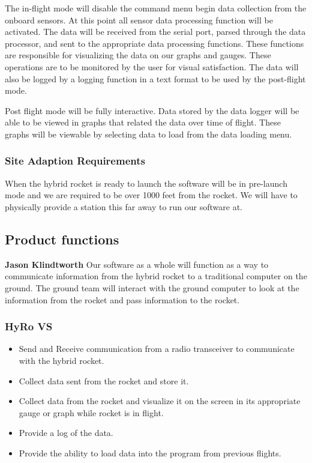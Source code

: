 \documentclass[10pt,draftclsnofoot,onecolumn,compsoc]{IEEEtran}
\begin{document}
	The in-flight mode will disable the command menu begin data collection from the onboard sensors. At this point all sensor data processing function will be activated. The data will be received from the serial port, parsed through the data processor, and sent to the appropriate data processing functions. These functions are responsible for visualizing the data on our graphs and gauges. These operations are to be monitored by the user for visual satisfaction.  The data will also be logged by a logging function in a text format to be used by the post-flight mode. \par
	Post flight mode will be fully interactive. Data stored by the data logger will be able to be viewed in graphs that related the data over time of flight. These graphs will be viewable by selecting data to load from the data loading menu.\par

\subsubsection{Site Adaption Requirements}
When the hybrid rocket is ready to launch the software will be in pre-launch mode and we are required to be over 1000 feet from the rocket. We will have to physically provide a station this far away to run our software at.

\subsection{ Product functions}
{\bf Jason Klindtworth}
Our software as a whole will function as a way to communicate information from the hybrid rocket to a traditional computer on the ground. The ground team will interact with the ground computer to look at the information from the rocket and pass information to the rocket.

\subsubsection{HyRo VS}
\begin{itemize}
\item Send and Receive communication from a radio transceiver to communicate with the hybrid rocket.
\item Collect data sent from the rocket and store it.
\item Collect data from the rocket and visualize it on the screen in its appropriate gauge or graph while rocket is in flight.
\item Provide a log of the data.
\item Provide the ability to load data into the program from previous flights.
\end{itemize}
\end{document}
